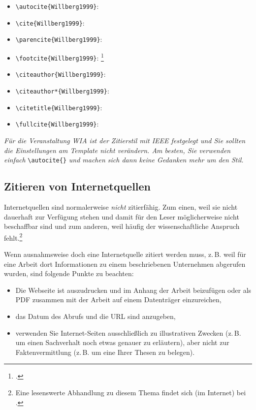 \documentclass[conference,compsoc,final,a4paper]{IEEEtran}
\begin{document}
\begin{itemize}
	\item \lstinline+\autocite{Willberg1999}+: \autocite{Willberg1999}
	\item \lstinline+\cite{Willberg1999}+: \cite{Willberg1999}
	\item \lstinline+\parencite{Willberg1999}+: \parencite{Willberg1999}
	\item \lstinline+\footcite{Willberg1999}+: \footcite{Willberg1999}
	\item \lstinline+\citeauthor{Willberg1999}+: \citeauthor{Willberg1999}
	\item \lstinline+\citeauthor*{Willberg1999}+: \citeauthor*{Willberg1999}
	\item \lstinline++: \citetitle{Willberg1999}
	\item \lstinline++: \fullcite{Willberg1999}
\end{itemize}

\textit{Für die Veranstaltung WIA ist der Zitierstil mit IEEE festgelegt und Sie sollten die Einstellungen am Template nicht verändern. Am besten, Sie verwenden einfach}  \lstinline+\autocite{}+ \textit{und machen sich dann keine Gedanken mehr um den Stil.}

\subsection{Zitieren von Internetquellen}
Internetquellen sind normalerweise \textit{nicht} zitierfähig. Zum einen, weil sie nicht dauerhaft zur Verfügung stehen und damit für den Leser möglicherweise nicht beschaffbar sind und zum anderen, weil häufig der wissenschaftliche Anspruch fehlt.\footnote{Eine lesenswerte Abhandlung zu diesem Thema findet sich (im Internet) bei \autocite{Weber2006}.}

Wenn ausnahmsweise doch eine Internetquelle zitiert werden muss, z.\,B. weil für eine Arbeit dort Informationen zu einem beschriebenen Unternehmen abgerufen wurden, sind folgende Punkte zu beachten:

\begin{itemize}
\item Die Webseite ist auszudrucken und im Anhang der Arbeit beizufügen oder als PDF zusammen mit der Arbeit auf einem Datenträger einzureichen,
\item das Datum des Abrufs und die URL sind anzugeben,
\item verwenden Sie Internet-Seiten ausschließlich zu illustrativen Zwecken (z.\,B. um einen Sachverhalt noch etwas genauer zu erläutern), aber nicht zur Faktenvermittlung (z.\,B. um eine Ihrer Thesen zu belegen).
\end{itemize}
\end{document}
